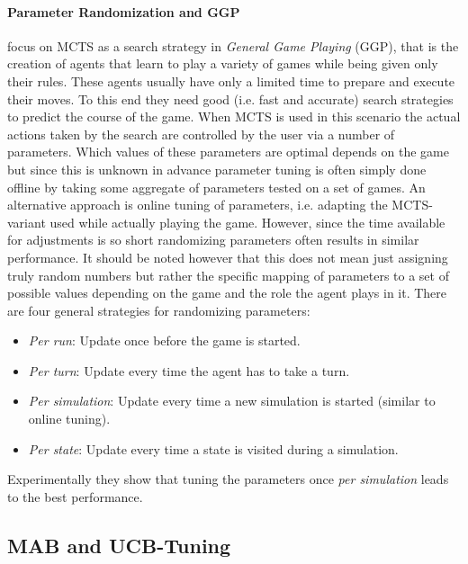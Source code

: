 \paragraph{Parameter Randomization and GGP}
\cite{sironi2019comparing} focus on MCTS as a search strategy in \textit{General Game Playing} (GGP), that is the creation of agents that learn to play a variety of games while being given only their rules. These agents usually have only a limited time to prepare and execute their moves. To this end they need good (i.e. fast and accurate) search strategies to predict the course of the game. When MCTS is used in this scenario the actual actions taken by the search are controlled by the user via a number of parameters. Which values of these parameters are optimal depends on the game but since this is unknown in advance parameter tuning is often simply done offline by taking some aggregate of parameters tested on a set of games. An alternative approach is online tuning of parameters, i.e. adapting the MCTS-variant used while actually playing the game. However, since the time available for adjustments is so short randomizing parameters often results in similar performance. It should be noted however that this does not mean just assigning truly random numbers but rather the specific mapping of parameters to a set of possible values depending on the game and the role the agent plays in it. There are four general strategies for randomizing parameters:
\begin{itemize}
    \item \textit{Per run}: Update once before the game is started.
    \item \textit{Per turn}: Update every time the agent has to take a turn.
    \item \textit{Per simulation}: Update every time a new simulation is started (similar to online tuning).
    \item \textit{Per state}: Update every time a state is visited during a simulation.
\end{itemize}
Experimentally they show that tuning the parameters once \textit{per simulation} leads to the best performance.
\subsection{MAB and UCB-Tuning}

